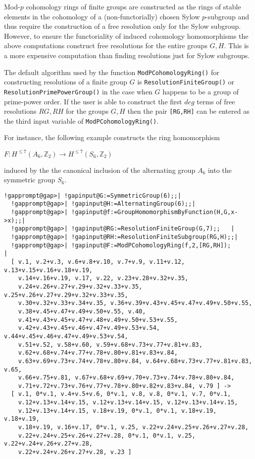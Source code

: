 \documentclass[a4paper,11pt]{report}
\begin{document}
{{{Mod-$p$ cohomology rings of finite groups are constructed as the rings of stable
elements in the cohomology of a (non-functorially) chosen Sylow $p$-subgroup and thus require the construction of a free resolution only for the
Sylow subgroup. However, to ensure the functoriality of induced cohomology
homomorphisms the above computations construct free resolutions for the entire
groups $G,H$. This is a more expensive computation than finding resolutions just for Sylow
subgroups. 

The default algorithm used by the function \texttt{ModPCohomologyRing()} for constructing resolutions of a finite group $G$ is \texttt{ResolutionFiniteGroup()} or \texttt{ResolutionPrimePowerGroup()} in the case when $G$ happens to be a group of prime-power order. If the user is able to construct
the first $deg$ terms of free resolutions $RG, RH$ for the groups $G, H$ then the pair \texttt{[RG,RH]} can be entered as the third input variable of \texttt{ModPCohomologyRing()}. 

For instance, the following example constructs the ring homomorphism 

$F\colon H^{\le 7}(A_6,\mathbb Z_2) \rightarrow H^{\le 7}(S_6,\mathbb Z_2)$ 

 induced by the the canonical inclusion of the alternating group $A_6$ into the symmetric group $S_6$. 
\begin{Verbatim}[commandchars=!@|,fontsize=\small,frame=single,label=Example]
  !gapprompt@gap>| !gapinput@G:=SymmetricGroup(6);;|
  !gapprompt@gap>| !gapinput@H:=AlternatingGroup(6);;|
  !gapprompt@gap>| !gapinput@f:=GroupHomomorphismByFunction(H,G,x->x);;|
  !gapprompt@gap>| !gapinput@RG:=ResolutionFiniteGroup(G,7);;   |
  !gapprompt@gap>| !gapinput@RH:=ResolutionFiniteSubgroup(RG,H);;|
  !gapprompt@gap>| !gapinput@F:=ModPCohomologyRing(f,2,[RG,RH]);       |
  [ v.1, v.2+v.3, v.6+v.8+v.10, v.7+v.9, v.11+v.12, v.13+v.15+v.16+v.18+v.19, 
    v.14+v.16+v.19, v.17, v.22, v.23+v.28+v.32+v.35, 
    v.24+v.26+v.27+v.29+v.32+v.33+v.35, v.25+v.26+v.27+v.29+v.32+v.33+v.35, 
    v.30+v.32+v.33+v.34+v.35, v.36+v.39+v.43+v.45+v.47+v.49+v.50+v.55, 
    v.38+v.45+v.47+v.49+v.50+v.55, v.40, 
    v.41+v.43+v.45+v.47+v.48+v.49+v.50+v.53+v.55, 
    v.42+v.43+v.45+v.46+v.47+v.49+v.53+v.54, v.44+v.45+v.46+v.47+v.49+v.53+v.54,
    v.51+v.52, v.58+v.60, v.59+v.68+v.73+v.77+v.81+v.83, 
    v.62+v.68+v.74+v.77+v.78+v.80+v.81+v.83+v.84, 
    v.63+v.69+v.73+v.74+v.78+v.80+v.84, v.64+v.68+v.73+v.77+v.81+v.83, v.65, 
    v.66+v.75+v.81, v.67+v.68+v.69+v.70+v.73+v.74+v.78+v.80+v.84, 
    v.71+v.72+v.73+v.76+v.77+v.78+v.80+v.82+v.83+v.84, v.79 ] -> 
  [ v.1, 0*v.1, v.4+v.5+v.6, 0*v.1, v.8, v.8, 0*v.1, v.7, 0*v.1, 
    v.12+v.13+v.14+v.15, v.12+v.13+v.14+v.15, v.12+v.13+v.14+v.15, 
    v.12+v.13+v.14+v.15, v.18+v.19, 0*v.1, 0*v.1, v.18+v.19, v.18+v.19, 
    v.18+v.19, v.16+v.17, 0*v.1, v.25, v.22+v.24+v.25+v.26+v.27+v.28, 
    v.22+v.24+v.25+v.26+v.27+v.28, 0*v.1, 0*v.1, v.25, v.22+v.24+v.26+v.27+v.28,
    v.22+v.24+v.26+v.27+v.28, v.23 ]
  

\end{Verbatim}}}}
\end{document}
